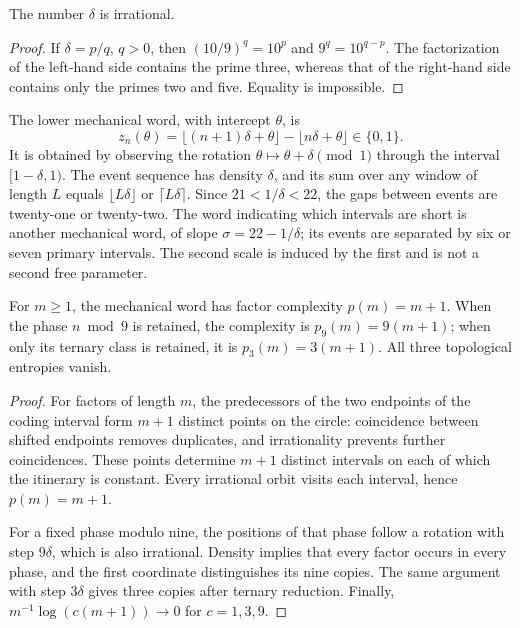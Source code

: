 \begin{lemma}
The number \(\delta\) is irrational.
\end{lemma}
\begin{proof}
If \(\delta=p/q\), \(q>0\), then \((10/9)^q=10^p\) and \(9^q=10^{q-p}\). The factorization of the left-hand side contains the prime three, whereas that of the right-hand side contains only the primes two and five. Equality is impossible.
\end{proof}

The lower mechanical word, with intercept \(\theta\), is
\[
 z_n(\theta)=\lfloor(n+1)\delta+\theta\rfloor-\lfloor n\delta+\theta\rfloor\in\{0,1\}.
\]
It is obtained by observing the rotation \(\theta\mapsto\theta+\delta\pmod1\) through the interval \([1-\delta,1)\). The event sequence has density \(\delta\), and its sum over any window of length \(L\) equals \(\lfloor L\delta\rfloor\) or \(\lceil L\delta\rceil\). Since \(21<1/\delta<22\), the gaps between events are twenty-one or twenty-two. The word indicating which intervals are short is another mechanical word, of slope \(\sigma=22-1/\delta\); its events are separated by six or seven primary intervals. The second scale is induced by the first and is not a second free parameter.



\begin{theorem}
For \(m\ge1\), the mechanical word has factor complexity \(p(m)=m+1\). When the phase \(n\bmod9\) is retained, the complexity is \(p_9(m)=9(m+1)\); when only its ternary class is retained, it is \(p_3(m)=3(m+1)\). All three topological entropies vanish.
\end{theorem}
\begin{proof}
For factors of length \(m\), the predecessors of the two endpoints of the coding interval form \(m+1\) distinct points on the circle: coincidence between shifted endpoints removes duplicates, and irrationality prevents further coincidences. These points determine \(m+1\) distinct intervals on each of which the itinerary is constant. Every irrational orbit visits each interval, hence \(p(m)=m+1\).

For a fixed phase modulo nine, the positions of that phase follow a rotation with step \(9\delta\), which is also irrational. Density implies that every factor occurs in every phase, and the first coordinate distinguishes its nine copies. The same argument with step \(3\delta\) gives three copies after ternary reduction. Finally, \(m^{-1}\log(c(m+1))\to0\) for \(c=1,3,9\).
\end{proof}

